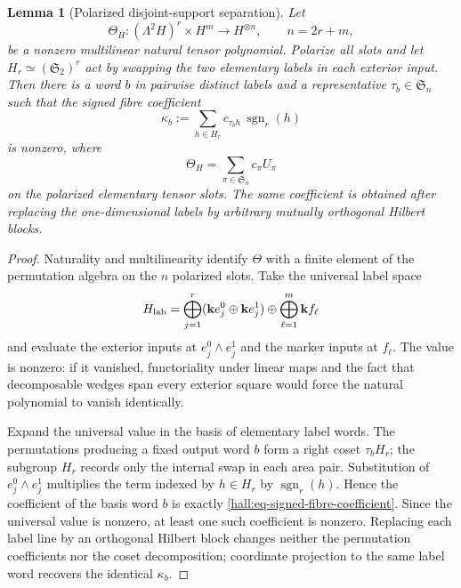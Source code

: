 \documentclass[10pt,reqno]{amsart}
\theoremstyle{plain}
\newtheorem{lemma}[theorem]{Lemma}
\theoremstyle{definition}
\theoremstyle{remark}
\begin{document}
\begin{lemma}[Polarized disjoint-support separation]
\label{hall:lem-polarized-label-separation}
Let
\[
 \Theta_H:(\Lambda^2H)^r\times H^m\longrightarrow H^{\otimes n},
 \qquad n=2r+m,
\]
be a nonzero multilinear natural tensor polynomial.  Polarize all slots and
let $H_r\simeq(\mathfrak S_2)^r$ act by swapping the two elementary labels in
each exterior input.  Then there is a word $b$ in pairwise distinct labels
and a representative $\tau_b\in\mathfrak S_n$ such that the signed fibre
coefficient
\begin{equation}
 \kappa_b:=\sum_{h\in H_r}c_{\tau_bh}\,\operatorname{sgn}_r(h)
 \label{hall:eq-signed-fibre-coefficient}
\end{equation}
is nonzero, where
\[
 \Theta_H=\sum_{\pi\in\mathfrak S_n}c_\pi U_\pi
\]
on the polarized elementary tensor slots.  The same coefficient is obtained
after replacing the one-dimensional labels by arbitrary mutually orthogonal
Hilbert blocks.
\end{lemma}

\begin{proof}
Naturality and multilinearity identify $\Theta$ with a finite element of the
permutation algebra on the $n$ polarized slots.  Take the universal label
space
\[
 H_{\rm lab}=\bigoplus_{j=1}^r
 (\mathbf k e_j^0\oplus\mathbf k e_j^1)
 \oplus\bigoplus_{\ell=1}^m\mathbf k f_\ell
\]
and evaluate the exterior inputs at $e_j^0\wedge e_j^1$ and the marker inputs
at $f_\ell$.  The value is nonzero: if it vanished, functoriality under
linear maps and the fact that decomposable wedges span every exterior square
would force the natural polynomial to vanish identically.

Expand the universal value in the basis of elementary label words.  The
permutations producing a fixed output word $b$ form a right coset
$\tau_bH_r$; the subgroup $H_r$ records only the internal swap in each area
pair.  Substitution of $e_j^0\wedge e_j^1$ multiplies the term indexed by
$h\in H_r$ by $\operatorname{sgn}_r(h)$.  Hence the coefficient of the basis
word $b$ is exactly \eqref{hall:eq-signed-fibre-coefficient}.  Since the
universal value is nonzero, at least one such coefficient is nonzero.
Replacing each label line by an orthogonal Hilbert block changes neither the
permutation coefficients nor the coset decomposition; coordinate projection
to the same label word recovers the identical $\kappa_b$.
\end{proof}
\end{document}
